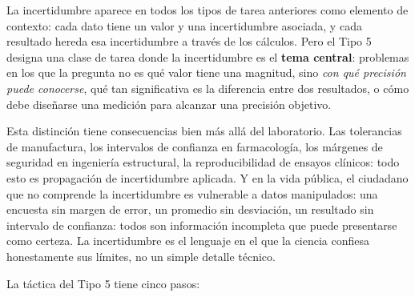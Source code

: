 \documentclass[11pt]{book}
\begin{document}
La incertidumbre aparece en todos los tipos de tarea anteriores como elemento de contexto: cada dato tiene un valor y una incertidumbre asociada, y cada resultado hereda esa incertidumbre a través de los cálculos. Pero el Tipo 5 designa una clase de tarea donde la incertidumbre es el {\bf tema central}: problemas en los que la pregunta no es qué valor tiene una magnitud, sino {\it con qué precisión puede conocerse}, qué tan significativa es la diferencia entre dos resultados, o cómo debe diseñarse una medición para alcanzar una precisión objetivo.

Esta distinción tiene consecuencias bien más allá del laboratorio. Las tolerancias de manufactura, los intervalos de confianza en farmacología, los márgenes de seguridad en ingeniería estructural, la reproducibilidad de ensayos clínicos: todo esto es propagación de incertidumbre aplicada. Y en la vida pública, el ciudadano que no comprende la incertidumbre es vulnerable a datos manipulados: una encuesta sin margen de error, un promedio sin desviación, un resultado sin intervalo de confianza: todos son información incompleta que puede presentarse como certeza. La incertidumbre es el lenguaje en el que la ciencia confiesa honestamente sus límites, no un simple detalle técnico.

\medskip
La táctica del Tipo 5 tiene cinco pasos:
\end{document}
